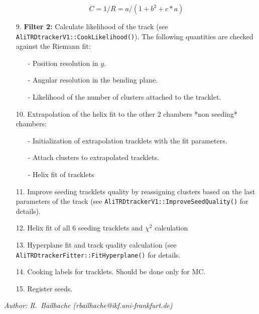 \documentclass{alicetdr}
\begin{document}
\begin{itemize}
          \begin{equation}
          C = 1/R = a/(1 + b^{2} + c*a)
          \end{equation}
\item[9.] {\bf Filter 2:} Calculate likelihood of the track 
          (see {\tt AliTRDtrackerV1::CookLikelihood()}). The following quantities are 
          checked against the Riemann fit:
          \begin{itemize}
          \item[-] Position resolution in $y$.
          \item[-] Angular resolution in the bending plane.
          \item[-] Likelihood of the number of clusters attached to the tracklet.
          \end{itemize}
\item[10.] Extrapolation of the helix fit to the other 2 chambers *non seeding* 
          chambers:
          \begin{itemize}
          \item[-] Initialization of extrapolation tracklets with the fit parameters.
          \item[-] Attach clusters to extrapolated tracklets.
          \item[-] Helix fit of tracklets
          \end{itemize}
\item[11.] Improve seeding tracklets quality by reassigning clusters based on the 
          last parameters of the track (see {\tt AliTRDtrackerV1::ImproveSeedQuality()} 
          for details).
\item[12.] Helix fit of all 6 seeding tracklets and $\chi^{2}$ calculation
\item[13.] Hyperplane fit and track quality calculation 
          (see {\tt AliTRDtrackerFitter::FitHyperplane()} for details.
\item[14.] Cooking labels for tracklets. Should be done only for MC.
\item[15.] Register seeds.
\end{itemize}

%
\newpage
\setcounter{chapter}{3}
\setcounter{section}{0}    
%
{\it Author: R.~Bailhache (rbailhache@ikf.uni-frankfurt.de)}
\smallskip
\\
%
\end{document}
